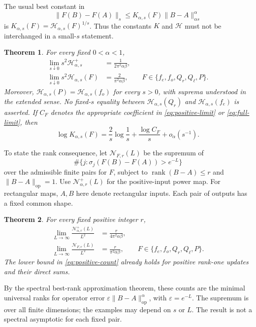 \documentclass[11pt]{article}
\newtheorem{theorem}{Theorem}[section]
\numberwithin{equation}{section}
\newcommand{\rank}{\operatorname{rank}}
\newcommand{\op}{\mathrm{op}}
\newcommand{\cH}{\mathcal H}
\newcommand{\cN}{\mathcal N}
\begin{document}
The usual best constant in
\[
 \|F(B)-F(A)\|_s
       \le K_{\alpha,s}(F)\|B-A\|_{\alpha s}^{\alpha}
\]
is $K_{\alpha,s}(F)=\cH_{\alpha,s}(F)^{1/s}$. Thus the constants
$K$ and $\cH$ must not be interchanged in a small-$s$ statement.

\begin{theorem}\label{thm:main}
For every fixed $0<\alpha<1$,
\begin{align}
 \lim_{s\downarrow0}s^2\cH^+_{\alpha,s}
       &=\frac{1}{2\pi^2\alpha\beta},                 \label{eq:positive-limit}\\
 \lim_{s\downarrow0}s^2\cH_{\alpha,s}(F)
       &=\frac{2}{\pi^2\alpha\beta},
       \qquad F\in\{f_e,f_o,Q_r,Q_\ell,P\}.           \label{eq:full-limit}
\end{align}
Moreover, $\cH_{\alpha,s}(P)=\cH_{\alpha,s}(f_o)$ for every $s>0$,
with suprema understood in the extended sense. No fixed-$s$ equality
between $\cH_{\alpha,s}(Q_r)$ and $\cH_{\alpha,s}(f_e)$ is asserted.
If $C_F$ denotes the appropriate coefficient in
\eqref{eq:positive-limit} or \eqref{eq:full-limit}, then
\begin{equation}\label{eq:usual-constant}
 \log K_{\alpha,s}(F)
 =\frac{2}{s}\log\frac1s+\frac{\log C_F}{s}
       +o_\alpha(s^{-1}).
\end{equation}
\end{theorem}

To state the rank consequence, let $\cN_{F,r}(L)$ be the supremum of
\[
 \#\{j:\sigma_j(F(B)-F(A))>e^{-L}\}
\]
over the admissible finite pairs for $F$, subject to
$\rank(B-A)\le r$ and $\|B-A\|_\op=1$. Use $\cN^+_{\alpha,r}(L)$
for the positive-input power map. For rectangular maps, $A,B$ here
denote rectangular inputs. Each pair of outputs has a fixed common shape.

\begin{theorem}\label{thm:count}
For every fixed positive integer $r$,
\begin{align}
 \lim_{L\to\infty}\frac{\cN^+_{\alpha,r}(L)}{L^2}
      &=\frac{r}{4\pi^2\alpha\beta},                  \label{eq:positive-count}\\
 \lim_{L\to\infty}\frac{\cN_{F,r}(L)}{L^2}
      &=\frac{r}{\pi^2\alpha\beta},
      \qquad F\in\{f_e,f_o,Q_r,Q_\ell,P\}.           \label{eq:full-count}
\end{align}
The lower bound in \eqref{eq:positive-count} already holds for positive
rank-one updates and their direct sums.
\end{theorem}

By the spectral best-rank approximation theorem, these counts are the
minimal universal ranks for operator error
$\varepsilon\|B-A\|_\op^\alpha$, with $\varepsilon=e^{-L}$.
The supremum is over all finite dimensions; the examples may depend on
$s$ or $L$. The result is not a spectral asymptotic for each fixed pair.
\end{document}
